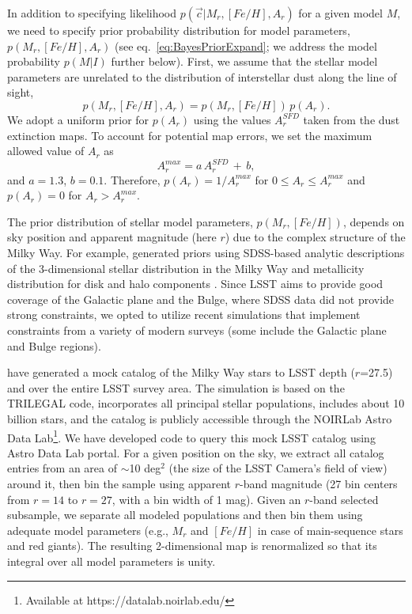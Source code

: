 In addition to specifying likelihood $p(\vec{c}|M_r, [Fe/H], A_r)$ for a given model $M$, we need to specify
prior probability distribution for model parameters, $p(M_r, [Fe/H],A_r)$ (see eq.~\ref{eq:BayesPriorExpand};
we address the model probability $p(M|I)$ further below). First, we assume that the stellar model parameters
are unrelated to the distribution of interstellar dust along the line of sight,
\begin{equation}
 \label{eq:BayesPrior2}
               p(M_r, [Fe/H],A_r) = p(M_r, [Fe/H]) \, p(A_r).
\end{equation}
We adopt a uniform prior for $p(A_r)$ using the values $A_r^{SFD}$ taken from the \cite{schlegel_maps_1998}
dust extinction maps. To account for potential map errors, we set the maximum allowed value of $A_r$ as
\begin{equation}
          A_r^{max} =  a \, A_r^{SFD} \, + \, b,
\end{equation}
and $a=1.3$, $b=0.1$. Therefore, $p(A_r) = 1/A_r^{max}$ for $0 \le A_r \le A_r^{max}$ and $p(A_r) = 0$ for $A_r > A_r^{max}$. 

The prior distribution of stellar model parameters, $p(M_r, [Fe/H])$, depends on sky position and apparent
magnitude (here $r$) due to the complex structure of the Milky Way. For example,  \cite{2014ApJ...783..114G}
generated priors using SDSS-based analytic descriptions of the 3-dimensional stellar distribution in the Milky Way
\citep{2008ApJ...673..864J} and metallicity distribution for disk and halo components \citep{2008ApJ...684..287I}. 
Since LSST aims to provide good coverage of the Galactic plane and the Bulge, where SDSS data did not provide strong
constraints, we opted to utilize recent simulations that implement constraints from a variety of modern surveys (some
include the Galactic plane and Bulge regions). 

\cite{dal_tio_simulating_2022} have generated a mock catalog of the Milky Way stars to LSST depth ($r$=27.5) and over
the entire LSST survey area. The simulation is based on the TRILEGAL code, incorporates all principal stellar populations,
includes about 10 billion stars, and the catalog is publicly accessible through the NOIRLab Astro Data
Lab\footnote{Available at https://datalab.noirlab.edu/}.
We have developed code to query this mock LSST catalog using Astro Data Lab portal. For a given position on the sky, we
extract all catalog entries from an area of $\sim$10 deg$^2$ (the size of the LSST Camera's field of view) around it, then bin
the sample using apparent $r$-band magnitude (27 bin centers from $r=14$ to $r=27$, with a bin width of 1 mag). 
Given an $r$-band selected subsample, we separate all modeled populations and then bin them using adequate model
parameters (e.g., $M_r$ and $[Fe/H]$ in case of main-sequence stars and red giants). The resulting 2-dimensional map
is renormalized so that its integral over all model parameters is unity.

